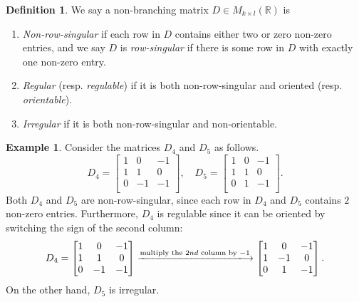 \documentclass{article}
\theoremstyle{definition}
\newtheorem{definition}[theorem]{Definition}
\newtheorem{example}[theorem]{Example}
\begin{document}
\begin{definition}
\label{def:reg_mtrx}
We say a non-branching matrix $D\in M_{k\times l}(\mathbb{R})$ is 
\begin{enumerate}
    \item \emph{Non-row-singular} if each row in $D$ contains either two or zero non-zero entries,
and we say $D$ is \emph{row-singular} if there is some row in $D$ with exactly one non-zero entry.
    \item \emph{Regular} (resp. \emph{regulable}) if it is both non-row-singular and oriented (resp. \emph{orientable}).
\item \emph{Irregular} if it is both non-row-singular and non-orientable.
\end{enumerate}
\end{definition}

\begin{example}
Consider the matrices $D_4$ and $D_5$ as follows.
\[
D_4
=
\begin{bmatrix}
1 & 0  & -1 \\
1 & 1  & 0 \\
0 & -1 & -1 \\
\end{bmatrix},
\quad
D_5
=
\begin{bmatrix}
1 & 0  & -1 \\
1 & 1  & 0 \\
0 & 1 & -1 \\
\end{bmatrix}.
\]
Both $D_4$ and $D_5$ are non-row-singular,
since each row in $D_4$ and $D_5$ contains $2$ non-zero entries.
Furthermore, $D_4$ is regulable since it can be oriented by switching the sign of the second column:
\[
D_4
=
\begin{bmatrix}
1 & 0  & -1\\
1 & 1  & 0 \\
0 & -1 & -1 \\
\end{bmatrix}
\xlongrightarrow{\text{multiply the $2nd$ column by $-1$}}
\begin{bmatrix}
1 & 0  & -1 \\
1 & -1  & 0 \\
0 & 1 & -1 \\
\end{bmatrix}.
\]
On the other hand, $D_5$ is irregular.
\end{example}
\end{document}
